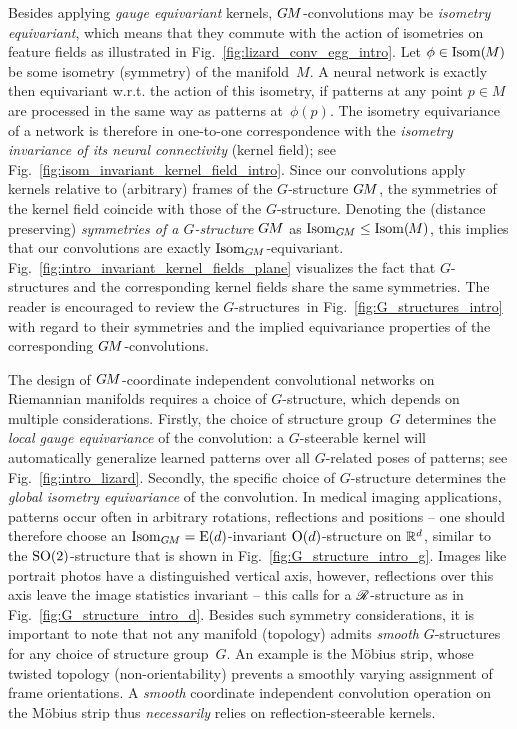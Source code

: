 Besides applying \emph{gauge equivariant} kernels, $G\mkern-1.4muM$-convolutions may be \emph{isometry equivariant}, which means that they commute with the action of isometries on feature fields as illustrated in Fig.~\ref{fig:lizard_conv_egg_intro}.
Let $\phi \in \operatorname{Isom}(\mkern-1.5mu M \mkern-.5mu)$ be some isometry (symmetry) of the manifold~$M$.
A neural network is exactly then equivariant w.r.t. the action of this isometry, if patterns at any point $p\in M$ are processed in the same way as patterns at~$\phi(p)$.
The isometry equivariance of a network is therefore in one-to-one correspondence with the \emph{isometry invariance of its neural connectivity} (kernel field); see Fig.~\ref{fig:isom_invariant_kernel_field_intro}.
Since our convolutions apply kernels relative to (arbitrary) frames of the $G$-structure $G\mkern-1.4muM$, the symmetries of the kernel field coincide with those of the $G$-structure.
Denoting the (distance preserving) \emph{symmetries of a $G$-structure} $G\mkern-1.4muM$ as $\operatorname{Isom}_{G\mkern-1.4muM} \leq \operatorname{Isom}(\mkern-1.5mu M \mkern-.5mu)$, this implies that our convolutions are exactly $\operatorname{Isom}_{G\mkern-1.4muM}$-equivariant.
Fig.~\ref{fig:intro_invariant_kernel_fields_plane} visualizes the fact that $G$-structures and the corresponding kernel fields share the same symmetries.
The reader is encouraged to review the $G$-structures~in Fig.~\ref{fig:G_structures_intro} with regard to their symmetries and the implied equivariance properties of the corresponding $G\mkern-1.4muM$-convolutions.


The design of $G\mkern-1.4muM$-coordinate independent convolutional networks on Riemannian manifolds requires a choice of $G$-structure, which depends on multiple considerations.
Firstly, the choice of structure group~$G$ determines the \emph{local gauge equivariance} of the convolution:
a $G$-steerable kernel will automatically generalize learned patterns over all $G$-related poses of patterns; see Fig.~\ref{fig:intro_lizard}.
Secondly, the specific choice of $G$-structure determines the \emph{global isometry equivariance} of the convolution.
In medical imaging applications, patterns occur often in arbitrary rotations, reflections and positions
-- one should therefore choose an $\operatorname{Isom}_{G\mkern-1.4muM} = \operatorname{E}(d)$-invariant $\operatorname{O}(d)$-structure on $\mathbb{R}^d$, similar to the $\operatorname{SO}(2)$-structure that is shown in Fig.~\ref{fig:G_structure_intro_g}.
Images like portrait photos have a distinguished vertical axis, however, reflections over this axis leave the image statistics invariant
-- this calls for a $\mathscr{R}$-structure as in Fig.~\ref{fig:G_structure_intro_d}.
Besides such symmetry considerations, it is important to note that not any manifold (topology) admits \emph{smooth} $G$-structures for any choice of structure group~$G$.
An example is the M\"obius strip, whose twisted topology (non-orientability) prevents a smoothly varying assignment of frame orientations.
A \emph{smooth} coordinate independent convolution operation on the M\"obius strip thus \emph{necessarily} relies on reflection-steerable kernels.


